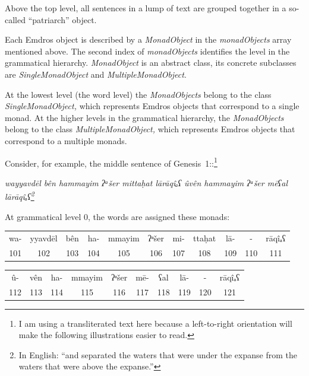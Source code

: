\documentclass[11pt,oneside,a4paper]{memoir}
\newcommand*{\bibleref}[3]{#1~#2\thinspace:\thinspace#3}
\begin{document}
Above the top level, all sentences in a lump of text are grouped together in a so-called
``patriarch'' object.

Each Emdros object is described by a \emph{MonadObject} in the \emph{monadObjects} array mentioned
above. The second index of \emph{monadObjects} identifies the level in the grammatical hierarchy.
\emph{MonadObject} is an abstract class, its concrete subclasses are \emph{SingleMonadObject} and
\emph{MultipleMonadObject}.

At the lowest level (the word level) the \emph{MonadObjects} belong to the class
\emph{SingleMonadObject,} which represents Emdros objects that correspond to a single monad. At the
higher levels in the grammatical hierarchy, the \emph{MonadObjects} belong to the class
\emph{MultipleMonadObject,} which represents Emdros objects that correspond to a multiple monads.

Consider, for example, the middle sentence of \bibleref{Genesis}{1}{7}:\footnote{I am using a transliterated text
  here because a left-to-right orientation will make the following illustrations easier to read.}

\begin{center}
\em{wayyavdēl bên hammayim ʔᵃšer mittaḥat lārāqîₐʕ ûvên hammayim ʔᵃšer mēʕal lārāqîₐʕ}\thinspace\footnote{In English: ``and separated the waters that were under the expanse from the waters that were above
the expanse.''}
\end{center}

\Needspace*{5cm}%
At grammatical level 0, the words are assigned these monads:

\begin{center}
\begin{shaded}
\begin{tabu}{@{}c|c|c|c|c|c|c|c|c|c|c@{}}
wa- & yyavdēl & bên & ha- & mmayim & ʔᵃšer & mi- & ttaḥat & lā- & - & rāqîₐʕ \\
101 & 102 & 103 & 104 & 105 & 106 & 107 & 108 & 109 & 110 & 111 \\
\end{tabu}

\vspace{5mm}

\begin{tabu}{@{}c|c|c|c|c|c|c|c|c|c@{}}
û- & vên & ha- & mmayim & ʔᵃšer & mē- & ʕal & lā- & - & rāqîₐʕ\\
112 & 113 & 114 & 115 & 116 & 117 & 118 & 119 & 120 & 121\\
\end{tabu}
\end{shaded}
\end{center}
\end{document}

